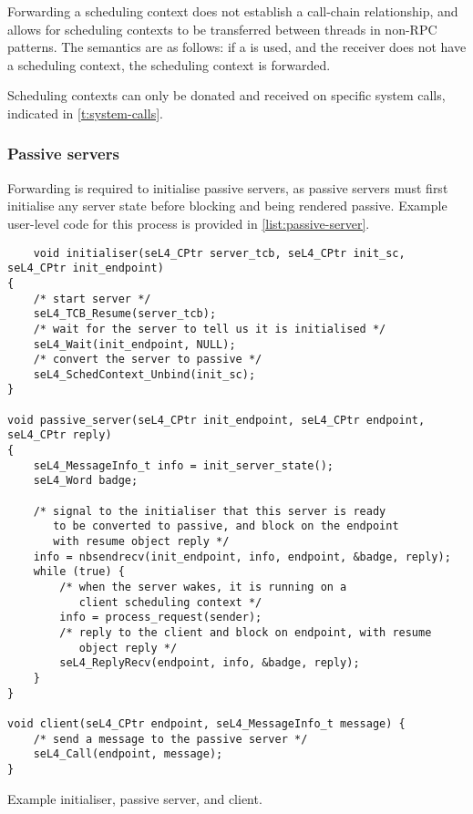 Forwarding a scheduling context does not establish a call-chain relationship, and allows
for scheduling contexts to be transferred between threads in non-RPC patterns. The semantics are
as follows: if a \nbsendrecv is used, and the receiver does not have a scheduling context,
the scheduling context is forwarded. 

Scheduling contexts can only be donated and received on specific system calls, indicated in
\cref{t:system-calls}. 

\subsubsection{Passive servers}
\label{sec:impl-passive-servers}

Forwarding is required to initialise passive servers, as passive servers must first initialise any 
server state before blocking and being rendered passive. Example user-level code for this process is 
provided in \cref{list:passive-server}. 

\begin{listing}[t]
\begin{verbatim}
    void initialiser(seL4_CPtr server_tcb, seL4_CPtr init_sc, seL4_CPtr init_endpoint) 
{
    /* start server */
    seL4_TCB_Resume(server_tcb);
    /* wait for the server to tell us it is initialised */
    seL4_Wait(init_endpoint, NULL);
    /* convert the server to passive */
    seL4_SchedContext_Unbind(init_sc);
}

void passive_server(seL4_CPtr init_endpoint, seL4_CPtr endpoint, seL4_CPtr reply) 
{    
    seL4_MessageInfo_t info = init_server_state();
    seL4_Word badge;

    /* signal to the initialiser that this server is ready 
       to be converted to passive, and block on the endpoint 
       with resume object reply */
    info = nbsendrecv(init_endpoint, info, endpoint, &badge, reply);
    while (true) {
        /* when the server wakes, it is running on a
           client scheduling context */
        info = process_request(sender);
        /* reply to the client and block on endpoint, with resume 
           object reply */
        seL4_ReplyRecv(endpoint, info, &badge, reply);
    }
}

void client(seL4_CPtr endpoint, seL4_MessageInfo_t message) {
    /* send a message to the passive server */
    seL4_Call(endpoint, message);
}
\end{verbatim}
\caption{Example initialiser, passive server, and client.}
\label{list:passive-server}
\end{listing}

